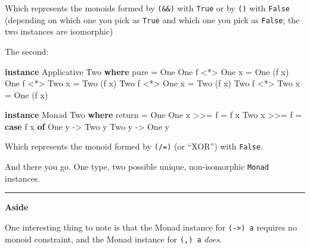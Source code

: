 \documentclass[]{article}
\newenvironment{Shaded}{}{}
\newcommand{\KeywordTok}[1]{\textcolor[rgb]{0.00,0.44,0.13}{\textbf{{#1}}}}
\newcommand{\DataTypeTok}[1]{\textcolor[rgb]{0.56,0.13,0.00}{{#1}}}
\newcommand{\OtherTok}[1]{\textcolor[rgb]{0.00,0.44,0.13}{{#1}}}
\newcommand{\FunctionTok}[1]{\textcolor[rgb]{0.02,0.16,0.49}{{#1}}}
\newcommand{\NormalTok}[1]{{#1}}
\begin{document}
Which represents the monoids formed by \texttt{(\&\&)} with
\texttt{True} or by \texttt{(\textbar{}\textbar{})} with \texttt{False}
(depending on which one you pick as \texttt{True} and which one you pick
as \texttt{False}; the two instances are isomorphic)

The second:

\begin{Shaded}
\begin{Highlighting}[]
\KeywordTok{instance} \DataTypeTok{Applicative} \DataTypeTok{Two} \KeywordTok{where}
    \NormalTok{pure }\FunctionTok{=} \DataTypeTok{One}
    \DataTypeTok{One} \NormalTok{f }\FunctionTok{<*>} \DataTypeTok{One} \NormalTok{x }\FunctionTok{=} \DataTypeTok{One} \NormalTok{(f x)}
    \DataTypeTok{One} \NormalTok{f }\FunctionTok{<*>} \DataTypeTok{Two} \NormalTok{x }\FunctionTok{=} \DataTypeTok{Two} \NormalTok{(f x)}
    \DataTypeTok{Two} \NormalTok{f }\FunctionTok{<*>} \DataTypeTok{One} \NormalTok{x }\FunctionTok{=} \DataTypeTok{Two} \NormalTok{(f x)}
    \DataTypeTok{Two} \NormalTok{f }\FunctionTok{<*>} \DataTypeTok{Two} \NormalTok{x }\FunctionTok{=} \DataTypeTok{One} \NormalTok{(f x)}

\KeywordTok{instance} \DataTypeTok{Monad} \DataTypeTok{Two} \KeywordTok{where}
    \NormalTok{return }\FunctionTok{=} \DataTypeTok{One}
    \DataTypeTok{One} \NormalTok{x }\FunctionTok{>>=} \NormalTok{f }\FunctionTok{=} \NormalTok{f x}
    \DataTypeTok{Two} \NormalTok{x }\FunctionTok{>>=} \NormalTok{f }\FunctionTok{=} \KeywordTok{case} \NormalTok{f x }\KeywordTok{of}
                    \DataTypeTok{One} \NormalTok{y }\OtherTok{->} \DataTypeTok{Two} \NormalTok{y}
                    \DataTypeTok{Two} \NormalTok{y }\OtherTok{->} \DataTypeTok{One} \NormalTok{y}
\end{Highlighting}
\end{Shaded}

Which represents the monoid formed by \texttt{(/=)} (or ``XOR'') with
\texttt{False}.

And there you go. One type, two possible unique, non-isomorphic
\texttt{Monad} instances.

\begin{center}\rule{0.5\linewidth}{\linethickness}\end{center}

\textbf{Aside}

One interesting thing to note is that the Monad instance for
\texttt{(-\textgreater{})\ a} requires no monoid constraint, and the
Monad instance for \texttt{(,)\ a} \emph{does}.
\end{document}
